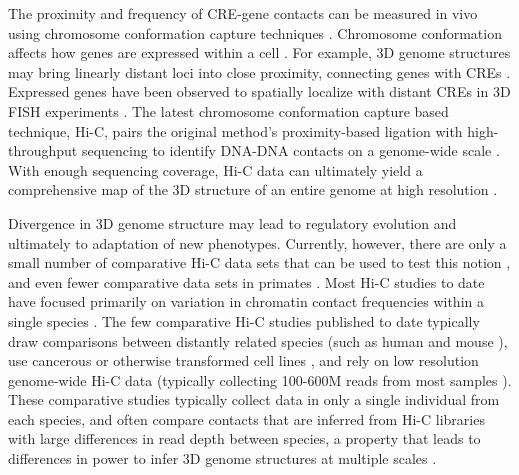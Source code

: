 The proximity and frequency of CRE-gene contacts can be measured in vivo using chromosome conformation capture techniques \cite{Dekker.2002}. Chromosome conformation affects how genes are expressed within a cell \cite{Babaei.2015, Gerstein.2012, Lan.2012, Botta.2010, Dong.2010, Homouz.2013, Jin.2013, Rao.2017}. For example, 3D genome structures may bring linearly distant loci into close proximity, connecting genes with CREs \cite{Shen.2012, Rieder.2012, Cremer.2001, Sexton.2007, Dekker.2008, Misteli.2007, Kosak.2004}. Expressed genes have been observed to spatially localize with distant CREs in 3D FISH experiments \cite{Rieder.2012, Schoenfelder.2010}. The latest chromosome conformation capture based technique, Hi-C, pairs the original method's proximity-based ligation with high-throughput sequencing to identify DNA-DNA contacts on a genome-wide scale \cite{Lieberman-Aiden.2009}. With enough sequencing coverage, Hi-C data can ultimately yield a comprehensive map of the 3D structure of an entire genome at high resolution \cite{Varoquaux.2014}.

Divergence in 3D genome structure may lead to regulatory evolution and ultimately to adaptation of new phenotypes. Currently, however, there are only a small number of comparative Hi-C data sets that can be used to test this notion \cite{Rudan.2015, Rao.2014, Dixon.2012}, and even fewer comparative data sets in primates \cite{Darrow.2016, Lazar.2018}. Most Hi-C studies to date have focused primarily on variation in chromatin contact frequencies within a single species \cite{Lieberman-Aiden.2009, Schmitt.2016, Kim.2017, Li.2015}. The few comparative Hi-C studies published to date typically draw comparisons between distantly related species (such as human and mouse \cite{Rao.2014, Dixon.2012}), use cancerous or otherwise transformed cell lines \cite{Rao.2014}, and rely on low resolution genome-wide Hi-C data (typically collecting 100-600M reads from most samples \cite{Rudan.2015, Dixon.2012, Dong.2017}). These comparative studies typically collect data in only a single individual from each species, and often compare contacts that are inferred from Hi-C libraries with large differences in read depth between species, a property that leads to differences in power to infer 3D genome structures at multiple scales \cite{Rudan.2015, Rao.2014, Dixon.2012}.

